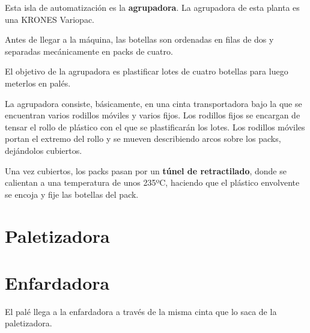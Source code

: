 \documentclass[11pt,a4paper,spanish,twoside]{report}
\begin{document}
Esta isla de automatización es la \textbf{agrupadora}. La agrupadora de esta 
planta es una KRONES Variopac.

Antes de llegar a la máquina, las botellas son ordenadas en filas de dos y 
separadas mecánicamente en packs de cuatro. 

El objetivo de la agrupadora es plastificar lotes de cuatro botellas para
luego meterlos en palés.

La agrupadora consiste, básicamente, en una cinta transportadora bajo la que 
se encuentran varios rodillos móviles y varios fijos. Los rodillos fijos se 
encargan de tensar el rollo de plástico con el que se plastificarán los lotes.
Los rodillos móviles portan el extremo del rollo y se mueven describiendo 
arcos sobre los packs, dejándolos cubiertos.

Una vez cubiertos, los packs pasan por un \textbf{túnel de retractilado}, 
donde se calientan a una temperatura de unos 235ºC, haciendo que el plástico
envolvente se encoja y fije las botellas del pack.

\section{Paletizadora}


\section{Enfardadora}
El palé llega a la enfardadora a través de la misma cinta que lo saca de la 
paletizadora. 
\end{document}
